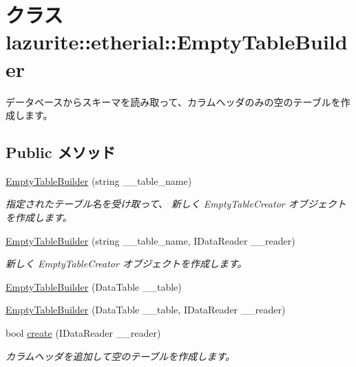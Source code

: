 \hypertarget{classlazurite_1_1etherial_1_1_empty_table_builder}{
\section{クラス lazurite::etherial::EmptyTableBuilder}
\label{classlazurite_1_1etherial_1_1_empty_table_builder}
}


データベースからスキーマを読み取って、カラムヘッダのみの空のテーブルを作成します。  
\subsection*{Public メソッド}
\begin{DoxyCompactItemize}
\item 
\hyperlink{classlazurite_1_1etherial_1_1_empty_table_builder_ac3007285611c6626e9b92fb072bfb825}{EmptyTableBuilder} (string \_\-\_\-table\_\-name)
\begin{DoxyCompactList}\small\item\em 指定されたテーブル名を受け取って、 新しく EmptyTableCreator オブジェクトを作成します。 \item\end{DoxyCompactList}\item 
\hyperlink{classlazurite_1_1etherial_1_1_empty_table_builder_a02be64055747f1e2318c379d72987ea3}{EmptyTableBuilder} (string \_\-\_\-table\_\-name, IDataReader \_\-\_\-reader)
\begin{DoxyCompactList}\small\item\em 新しく EmptyTableCreator オブジェクトを作成します。 \item\end{DoxyCompactList}\item 
\hyperlink{classlazurite_1_1etherial_1_1_empty_table_builder_ab0d2d265dd8d6508b5421865955211d5}{EmptyTableBuilder} (DataTable \_\-\_\-table)
\item 
\hyperlink{classlazurite_1_1etherial_1_1_empty_table_builder_ae3158d676e624b4162cbaa25eead4622}{EmptyTableBuilder} (DataTable \_\-\_\-table, IDataReader \_\-\_\-reader)
\item 
bool \hyperlink{classlazurite_1_1etherial_1_1_empty_table_builder_a7f64cba5d6702bc3fd43c81090fd185c}{create} (IDataReader \_\-\_\-reader)
\begin{DoxyCompactList}\small\item\em カラムヘッダを追加して空のテーブルを作成します。 \item\end{DoxyCompactList}\end{DoxyCompactItemize}
